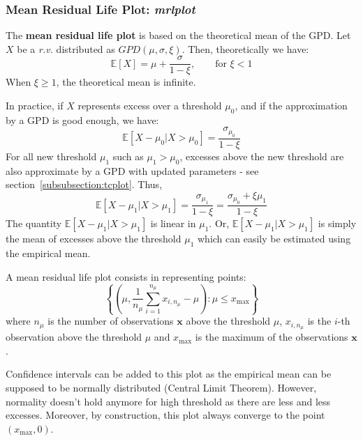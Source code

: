 \documentclass[11pt,a4paper]{article}
\numberwithin{equation}{section}
\begin{document}
\subsubsection{Mean Residual Life Plot: \emph{mrlplot}}

The \textbf{mean residual life plot} is based on the theoretical mean
of the GPD. Let $X$ be a \textit{r.v.} distributed as $GPD(\mu,
\sigma, \xi)$. Then, theoretically we have:
\begin{equation}
  \label{eq:meanGPD}
  \mathbb{E}\left[X \right] = \mu + \frac{\sigma}{1-\xi}, \qquad
  \text{for } \xi < 1
\end{equation}
When $\xi\geq1$, the theoretical mean is infinite.

In practice, if $X$ represents excess over a threshold $\mu_0$, and if
the approximation by a GPD is good enough, we have:
\begin{equation}
  \label{eq:meanExcess}
  \mathbb{E}\left[X - \mu_0 | X > \mu_0 \right] =
  \frac{\sigma_{\mu_0}}{1 - \xi}
\end{equation}
For all new threshold $\mu_1$ such as $\mu_1 > \mu_0$, excesses above
the new threshold are also approximate by a GPD with updated
parameters - see section~\ref{subsubsection:tcplot}. Thus,
\begin{equation}
  \label{eq:meanExcess2}
  \mathbb{E}\left[X - \mu_1 | X > \mu_1 \right] =
  \frac{\sigma_{\mu_1}}{1 - \xi} = \frac{\sigma_{\mu_0} +
    \xi \mu_1}{1 - \xi}
\end{equation}
The quantity $\mathbb{E}\left[X - \mu_1 | X > \mu_1 \right]$ is linear
in $\mu_1$. Or, $\mathbb{E}\left[X - \mu_1 | X > \mu_1 \right]$ is
simply the mean of excesses above the threshold $\mu_1$ which can
easily be estimated using the empirical mean.

A mean residual life plot consists in representing points:
\begin{equation}
  \label{eq:mrlplot}
  \left\{\left(\mu, \frac{1}{n_\mu} \sum_{i=1}^{n_\mu} x_{i, n_\mu} -
      \mu \right) : \mu \leq x_\mathrm{max} \right\}
\end{equation}
where $n_\mu$ is the number of observations $\mathbf{x}$ above the
threshold $\mu$, $x_{i, n_\mu}$ is the $i$-th observation above the
threshold $\mu$ and $x_\mathrm{max}$ is the maximum of the
observations $\mathbf{x}$.

Confidence intervals can be added to this plot as the empirical mean
can be supposed to be normally distributed (Central Limit
Theorem). However, normality doesn't hold anymore for high threshold
as there are less and less excesses. Moreover, by construction, this
plot always converge to the point $(x_\mathrm{max}, 0)$.
\end{document}
